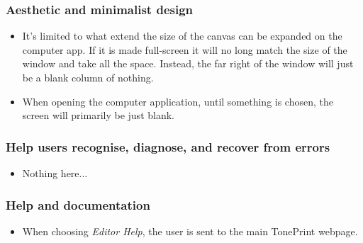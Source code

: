 \subsubsection{Aesthetic and minimalist design}
\begin{itemize}
	\item It’s limited to what extend the size of the canvas can be expanded on the computer app. If it is made full-screen it will no long match the size of the window and take all the space. Instead, the far right of the window will just be a blank column of nothing.\\
	\item When opening the computer application, until something is chosen, the screen will primarily be just blank.
\end{itemize}
%
\subsubsection{Help users recognise, diagnose, and recover from errors}
\begin{itemize}
	\item Nothing here...
\end{itemize}
%
\subsubsection{Help and documentation}
\begin{itemize}
	\item When choosing \textit{Editor Help}, the user is sent to the main TonePrint webpage.
\end{itemize}
%







